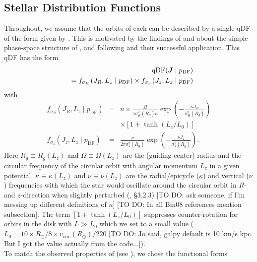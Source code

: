 


\subsection{Stellar Distribution Functions} \label{sec:qDF}

Throughout, we assume that the orbits of each \MAP{} can be described by a single qDF of the form given by \citet{bin11}. This is motivated by the findings of \citet{bov12b,bov12c,bov12d} and \citet{tin13} about the simple phase-space structure of \MAPs{}, and following \citet{bov13} and their successful application. This qDF has the form
\begin{eqnarray}
&&\text{qDF}(\boldsymbol{J} \mid p_\text{DF}) \nonumber\\
&&= f_{\sigma_R}\left(J_R,L_z \mid p_\text{DF}\right) \times f_{\sigma_z}\left(J_z,L_z \mid p_\text{DF}\right)\label{eq:df_general}\end{eqnarray}
with
\begin{eqnarray}
f_{\sigma_R}\left(J_R,L_z \mid p_\text{DF}\right) &=& n \times \frac{\Omega}{\pi\sigma_R^2(R_g) \kappa}\exp\left(-\frac{\kappa J_R}{\sigma_R^2(R_g)} \right) \nonumber\\
&& \times \left[1+\tanh\left(L_z/L_0\right) \right]\\
f_{\sigma_z}\left(J_z,L_z \mid p_\text{DF} \right) &=& \frac{\nu}{2 \pi \sigma_z^2(R_g)} \exp\left( -\frac{\nu J_z}{\sigma_z^2(R_g)} \right).
\end{eqnarray}
Here $R_g \equiv R_g(L_z)$ and $\Omega\equiv \Omega(L_z)$ are the (guiding-center) radius and the circular frequency of the circular orbit with angular momentum $L_z$ in a given potential. $\kappa\equiv \kappa(L_z)$ and $\nu\equiv \nu(L_z)$ are the radial/epicycle ($\kappa$) and vertical ($\nu$) frequencies with which the star would oscillate around the circular orbit in $R$- and $z$-direction when slightly perturbed (\citealt{bin08}, \S 3.2.3) [TO DO: ask someone, if I'm messing up different definitions of $\kappa$] [TO DO: In all Bin08 references mention subsection]. The term $\left[1+\tanh\left(L_z/L_0\right) \right]$ suppresses counter-rotation for orbits in the disk with $L \gg L_0$ which we set to a small value ($L_0 = 10 \times R_\odot/8 \times v_\text{circ}(R_\odot)/220$ [TO DO: Jo said, galpy default is 10 km/s kpc. But I got the value actually from the code...]).
\\To match the observed properties of \MAPs{} (see \citealt{bov12b,bov12b,bov12c}), we chose the functional forms
